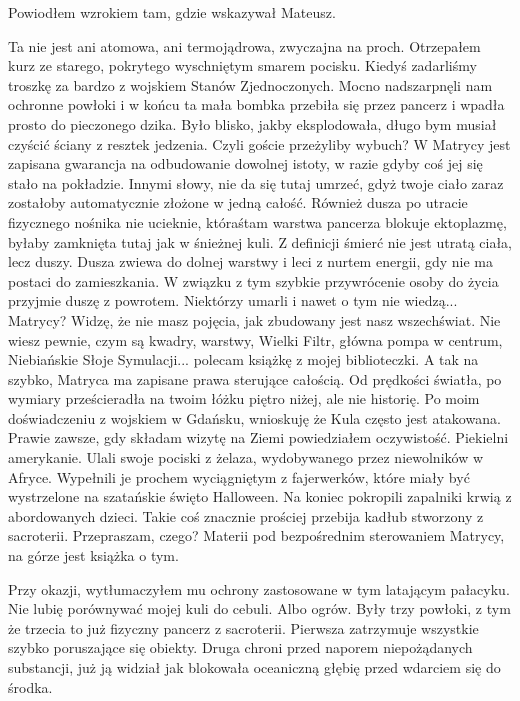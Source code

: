 Powiodłem wzrokiem tam, gdzie wskazywał Mateusz.
\begin{dialogue}
\ds{} Ta nie jest ani atomowa, ani termojądrowa, zwyczajna na proch. \dm{} Otrzepałem kurz ze starego, pokrytego wyschniętym smarem pocisku. \dm{} 
Kiedyś zadarliśmy troszkę za bardzo z wojskiem Stanów Zjednoczonych. 
Mocno nadszarpnęli nam ochronne powłoki i w końcu ta mała bombka przebiła się przez pancerz i wpadła prosto do pieczonego dzika.
Było blisko, jakby eksplodowała, długo bym musiał czyścić ściany z resztek jedzenia.
\ds{} Czyli goście przeżyliby wybuch?
\ds{} W Matrycy jest zapisana gwarancja na odbudowanie dowolnej istoty, w razie gdyby coś jej się stało na pokładzie. 
Innymi słowy, nie da się tutaj umrzeć, gdyż twoje ciało zaraz zostałoby automatycznie złożone w jedną całość.
Również dusza po utracie fizycznego nośnika nie ucieknie, któraśtam warstwa pancerza blokuje ektoplazmę, byłaby zamknięta tutaj jak w śnieżnej kuli.
Z definicji śmierć nie jest utratą ciała, lecz duszy. Dusza zwiewa do dolnej warstwy i leci z nurtem energii, gdy nie ma postaci do zamieszkania. 
W związku z tym szybkie przywrócenie osoby do życia przyjmie duszę z powrotem.
Niektórzy umarli i nawet o tym nie wiedzą...
\ds{} Matrycy?
\ds{} Widzę, że nie masz pojęcia, jak zbudowany jest nasz wszechświat. Nie wiesz pewnie, czym są kwadry, warstwy, Wielki Filtr, główna pompa w centrum, 
Niebiańskie Słoje Symulacji... polecam książkę z mojej biblioteczki.
A tak na szybko, Matryca ma zapisane prawa sterujące całością. Od prędkości światła, po wymiary prześcieradła na twoim łóżku piętro niżej, ale nie historię.
\ds{} Po moim doświadczeniu z wojskiem w Gdańsku, wnioskuję że Kula często jest atakowana.
\ds{} Prawie zawsze, gdy składam wizytę na Ziemi \dm{} powiedziałem oczywistość. \dm{} Piekielni amerykanie. 
Ulali swoje pociski z żelaza, wydobywanego przez niewolników w Afryce.
Wypełnili je prochem wyciągniętym z fajerwerków, które miały być wystrzelone na szatańskie święto Halloween. 
Na koniec pokropili zapalniki krwią z abordowanych dzieci.
Takie coś znacznie prościej przebija kadłub stworzony z sacroterii.
\ds{} Przepraszam, czego?
\ds{} Materii pod bezpośrednim sterowaniem Matrycy, na górze jest książka o tym.
\end{dialogue}

Przy okazji, wytłumaczyłem mu ochrony zastosowane w tym latającym pałacyku. 
Nie lubię porównywać mojej kuli do cebuli. Albo ogrów.
Były trzy powłoki, z tym że trzecia to już fizyczny pancerz z sacroterii.
Pierwsza zatrzymuje wszystkie szybko poruszające się obiekty.
Druga chroni przed naporem niepożądanych substancji, już ją widział jak blokowała oceaniczną głębię przed wdarciem się do środka.

